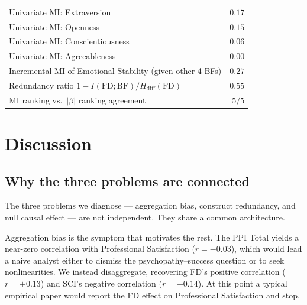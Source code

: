 \documentclass[11pt,a4paper]{article}
\begin{document}
\begin{table}[h!]
\begin{tabular}{lr}
Univariate MI: Extraversion                                                       & $0.17$ \\
Univariate MI: Openness                                                           & $0.15$ \\
Univariate MI: Conscientiousness                                                  & $0.06$ \\
Univariate MI: Agreeableness                                                      & $0.00$ \\
Incremental MI of Emotional Stability (given other 4 BFs)                         & $0.27$ \\
Redundancy ratio $1 - I(\text{FD}; \text{BF}) / H_{\text{diff}}(\text{FD})$       & $0.55$ \\
MI ranking vs.\ $|\beta|$ ranking agreement                                       & $5/5$ \\
\bottomrule
\end{tabular}
\end{table}

\section{Discussion}
\label{sec:discussion}

\subsection{Why the three problems are connected}

The three problems we diagnose --- aggregation bias, construct
redundancy, and null causal effect --- are not independent. They
share a common architecture.

Aggregation bias is the symptom that motivates the rest. The PPI Total
yields a near-zero correlation with Professional Satisfaction
($r=-0.03$), which would lead a naive analyst either to dismiss the
psychopathy--success question or to seek nonlinearities. We instead
disaggregate, recovering FD's positive correlation ($r=+0.13$) and
SCI's negative correlation ($r=-0.14$). At this point a typical
empirical paper would report the FD effect on Professional
Satisfaction and stop.
\end{document}
